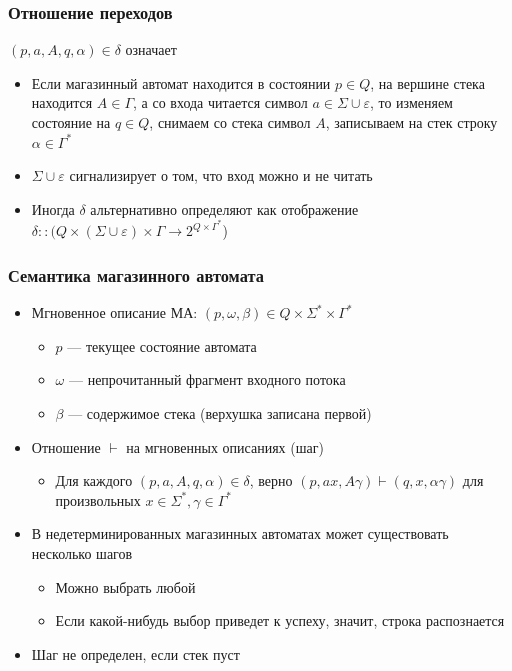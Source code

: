 \documentclass{beamer}
\begin{document}
\begin{frame}[fragile]
  \transwipe[direction=90]
  \frametitle{Отношение переходов}
  $(p, a, A, q, \alpha) \in \delta$  означает
  \begin{itemize}
    \item Если магазинный автомат находится в состоянии $p \in Q$, на вершине стека находится $A \in \Gamma$, а со входа читается символ $a \in \Sigma \cup \varepsilon$, то изменяем состояние на $q \in Q$, снимаем со стека символ $A$, записываем на стек строку $\alpha \in \Gamma^*$
    \item $\Sigma \cup \varepsilon$ сигнализирует о том, что вход можно и не читать
    \item Иногда $\delta$ альтернативно определяют как отображение $\delta :: (Q \times (\Sigma \cup \varepsilon) \times \Gamma \rightarrow 2^{Q \times \Gamma^*}$)
  \end{itemize}
\end{frame}

\begin{frame}[fragile]
  \transwipe[direction=90]
  \frametitle{Семантика магазинного автомата}
\begin{itemize}
  \item Мгновенное описание МА: $(p, \omega, \beta) \in Q \times \Sigma^* \times \Gamma^*$
  \begin{itemize}
  	\item $p$ --- текущее состояние автомата
  	\item $\omega$ --- непрочитанный фрагмент входного потока
  	\item $\beta$ --- содержимое стека (верхушка записана первой)
  \end{itemize}    
  \item Отношение $\vdash$ на мгновенных описаниях (шаг)
  \begin{itemize}
  	\item Для каждого $(p, a, A, q, \alpha) \in \delta$, верно $(p, a x, A \gamma) \vdash (q, x, \alpha \gamma)$ для произвольных $x \in \Sigma^*, \gamma \in \Gamma^*$
  \end{itemize}
  \item В недетерминированных магазинных автоматах может существовать несколько шагов
  \begin{itemize}
    \item Можно выбрать любой
    \item Если какой-нибудь выбор приведет к успеху, значит, строка распознается
  \end{itemize}
  \item Шаг не определен, если стек пуст
\end{itemize}

\end{frame}
\end{document}
